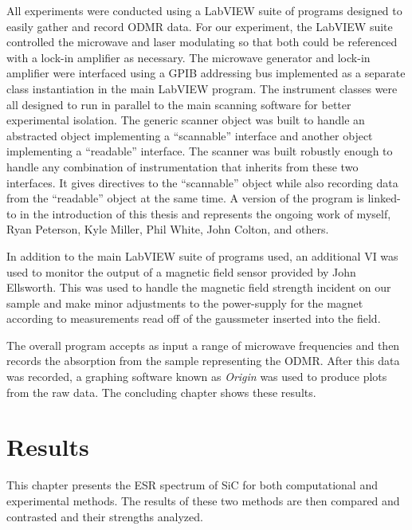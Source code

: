 \documentclass[oneside]{BYUPhys}
\begin{document}
All experiments were conducted using a LabVIEW suite of programs designed to easily gather and record ODMR data. For our experiment, the LabVIEW suite controlled the microwave and laser modulating so that both could be referenced with a lock-in amplifier as necessary. The microwave generator and lock-in amplifier were interfaced using a GPIB addressing bus implemented as a separate class instantiation in the main LabVIEW program. The instrument classes were all designed to run in parallel to the main scanning software for better experimental isolation. The generic scanner object was built to handle an abstracted object implementing a ``scannable'' interface and another object implementing a ``readable'' interface. The scanner was built robustly enough to handle any combination of instrumentation that inherits from these two interfaces. It gives directives to the ``scannable'' object while also recording data from the ``readable'' object at the same time. A version of the program is linked-to in the introduction of this thesis and represents the ongoing work of myself, Ryan Peterson, Kyle Miller, Phil White, John Colton, and others.

In addition to the main LabVIEW suite of programs used, an additional VI was used to monitor the output of a magnetic field sensor provided by John Ellsworth. This was used to handle the magnetic field strength incident on our sample and make minor adjustments to the power-supply for the magnet according to measurements read off of the gaussmeter inserted into the field.

The overall program accepts as input a range of microwave frequencies and then records the absorption from the sample representing the ODMR. After this data was recorded, a graphing software known as \textit{Origin} was used to produce plots from the raw data. The concluding chapter shows these results.










\chapter{Results}

This chapter presents the ESR spectrum of SiC for both computational and experimental methods. The results of these two methods are then compared and contrasted and their strengths analyzed.
\end{document}
